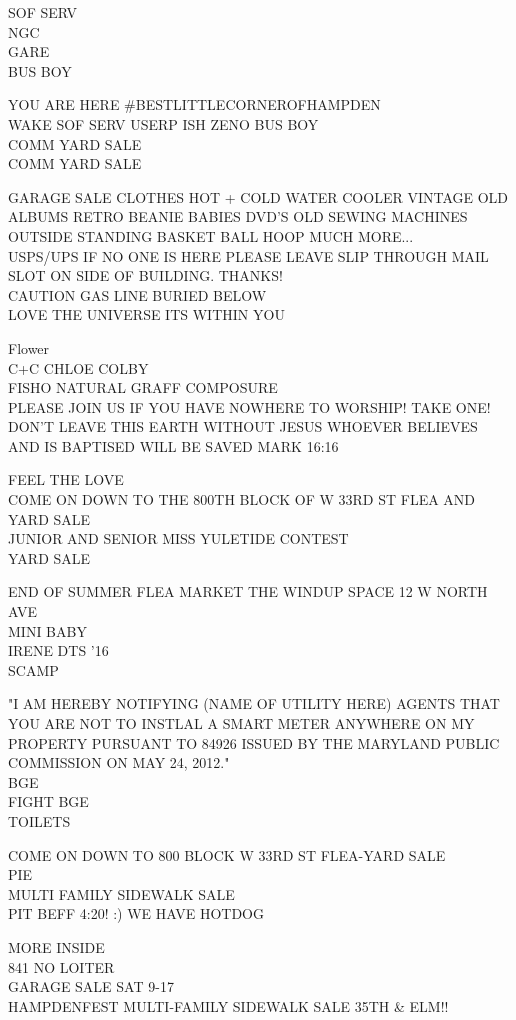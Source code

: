 \documentclass[10pt,letterpaper]{article}
\begin{document}
SOF SERV\\
NGC\\
GARE\\
BUS BOY

YOU ARE HERE \#BESTLITTLECORNEROFHAMPDEN\\
WAKE SOF SERV USERP ISH ZENO BUS  BOY\\
COMM YARD SALE\\
COMM YARD SALE

GARAGE SALE CLOTHES HOT + COLD WATER COOLER VINTAGE OLD ALBUMS RETRO BEANIE BABIES DVD'S OLD SEWING MACHINES OUTSIDE STANDING BASKET BALL HOOP MUCH MORE...\\
USPS/UPS IF NO ONE IS HERE PLEASE LEAVE SLIP THROUGH MAIL SLOT ON SIDE OF BUILDING.  THANKS!\\
CAUTION GAS LINE BURIED BELOW\\
LOVE THE UNIVERSE ITS WITHIN YOU

Flower\\
C+C CHLOE COLBY\\
FISHO NATURAL GRAFF COMPOSURE\\
PLEASE JOIN US IF YOU HAVE NOWHERE TO WORSHIP!  TAKE ONE!  DON'T LEAVE THIS EARTH WITHOUT JESUS WHOEVER BELIEVES AND IS BAPTISED WILL BE SAVED MARK 16:16

FEEL THE LOVE\\
COME ON DOWN TO THE 800TH BLOCK OF W 33RD ST FLEA AND YARD SALE\\
JUNIOR AND SENIOR MISS YULETIDE CONTEST\\
YARD SALE

END OF SUMMER FLEA MARKET THE WINDUP SPACE 12 W NORTH AVE\\
MINI BABY\\
IRENE DTS '16\\
SCAMP

"I AM HEREBY NOTIFYING (NAME OF UTILITY HERE) AGENTS THAT YOU ARE NOT TO INSTLAL A SMART METER ANYWHERE ON MY PROPERTY PURSUANT TO 84926 ISSUED BY THE MARYLAND PUBLIC COMMISSION ON MAY 24, 2012."\\
BGE\\
FIGHT BGE\\
TOILETS

COME ON DOWN TO 800 BLOCK W 33RD ST FLEA{-}YARD SALE\\
PIE\\
MULTI FAMILY SIDEWALK SALE\\
PIT BEFF 4:20! :) WE HAVE HOTDOG

MORE INSIDE\\
841 NO LOITER\\
GARAGE SALE SAT 9{-}17\\
HAMPDENFEST MULTI{-}FAMILY SIDEWALK SALE 35TH \& ELM!!
\end{document}
